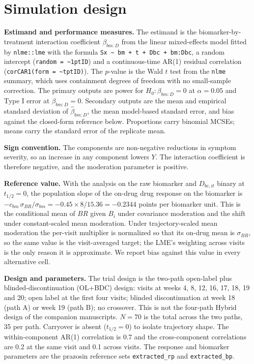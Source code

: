 \documentclass[
  11pt,
]{article}
\begin{document}
\section{Simulation design}\label{simulation-design}

\textbf{Estimand and performance measures.} The estimand is the
biomarker-by-treatment interaction coefficient \(\beta_{bm:D}\) from the
linear mixed-effects model fitted by \texttt{nlme::lme} with the formula
\texttt{Sx\ \textasciitilde{}\ bm\ +\ t\ +\ Dbc\ +\ bm:Dbc}, a random intercept (\texttt{random\ =\ \textasciitilde{}1\textbar{}ptID})
and a continuous-time AR(1) residual correlation
(\texttt{corCAR1(form\ =\ \textasciitilde{}t\textbar{}ptID)}). The \(p\)-value is the Wald \(t\) test from
the \texttt{nlme} summary, which uses containment degrees of freedom with no
small-sample correction. The primary outputs are power for
\(H_0: \beta_{bm:D} = 0\) at \(\alpha = 0.05\) and Type I error at
\(\beta_{bm:D} = 0\). Secondary outputs are the mean and empirical
standard deviation of \(\hat\beta_{bm:D}\), the mean model-based
standard error, and bias against the closed-form reference below.
Proportions carry binomial MCSEs; means carry the standard error of the
replicate mean.

\textbf{Sign convention.} The components are non-negative reductions in
symptom severity, so an increase in any component lowers \(Y\). The
interaction coefficient is therefore negative, and the moderation
parameter is positive.

\textbf{Reference value.} With the analysis on the raw biomarker and
\(D_{bc,it}\) binary at \(t_{1/2} = 0\), the population slope of the
on-drug drug response on the biomarker is
\(-c_{bm}\,\sigma_{BR}/\sigma_{bm} = -0.45 \times 8 /
15.36 = -0.2344\) points per
biomarker unit. This is the conditional mean of \(BR\) given \(B_i\) under
covariance moderation and the shift under constant-scaled mean
moderation. Under trajectory-scaled mean moderation the per-visit
multiplier is normalized so that its on-drug mean is \(\sigma_{BR}\), so
the same value is the visit-averaged target; the LME's weighting across
visits is the only reason it is approximate. We report bias against
this value in every alternative cell.

\textbf{Design and parameters.} The trial design is the two-path open-label
plus blinded-discontinuation (OL+BDC) design: visits at weeks 4, 8, 12,
16, 17, 18, 19 and 20; open label at the first four visits; blinded
discontinuation at week 18 (path A) or week 19 (path B); no crossover.
This is not the four-path Hybrid design of the companion manuscripts.
\(N = 70\) is the total across the two paths, 35 per path. Carryover is
absent (\(t_{1/2} = 0\)) to isolate trajectory shape. The within-component
AR(1) correlation is 0.7 and the cross-component correlations are 0.2
at the same visit and 0.1 across visits. The response and biomarker
parameters are the prazosin reference sets \texttt{extracted\_rp} and
\texttt{extracted\_bp}.
\end{document}
